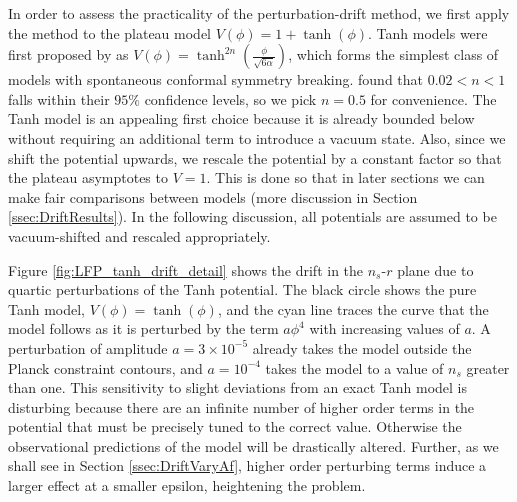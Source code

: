 \documentclass[a4paper,11pt]{article}
\def\nsr{$n_s$-$r$ }
\begin{document}
In order to assess the practicality of the perturbation-drift method, we first apply the method to the plateau model $V(\phi)=1+\tanh(\phi)$. Tanh models were first proposed by \citet{Kallosh+2013} as $V(\phi)=\tanh^{2n}(\tfrac{\phi}{\sqrt{6\alpha}})$, which forms the simplest class of models with spontaneous conformal symmetry breaking. \citet{Planck2015} found that $0.02<n<1$ falls within their $95\%$ confidence levels, so we pick $n=0.5$ for convenience. The Tanh model is an appealing first choice because it is already bounded below without requiring an additional term to introduce a vacuum state. Also, since we shift the potential upwards, we rescale the potential by a constant factor so that the plateau asymptotes to $V=1$. This is done so that in later sections we can make fair comparisons between models (more discussion in Section \ref{ssec:DriftResults}). In the following discussion, all potentials are assumed to be vacuum-shifted and rescaled appropriately.

Figure \ref{fig:LFP_tanh_drift_detail} shows the drift in the \nsr plane due to quartic perturbations of the Tanh potential. The black circle shows the pure Tanh model, $V(\phi)=\tanh(\phi)$, and the cyan line traces the curve that the model follows as it is perturbed by the term $a\phi^4$ with increasing values of $a$. A perturbation of amplitude $a=3\times10^{-5}$ already takes the model outside the Planck constraint contours,  and $a=10^{-4}$ takes the model to a value of $n_s$ greater than one. This sensitivity to slight deviations from an exact Tanh model is disturbing because there are an infinite number of higher order terms in the potential that must be precisely tuned to the correct value. Otherwise the observational predictions of the model will be drastically altered. Further, as we shall see in Section \ref{ssec:DriftVaryAf}, higher order perturbing terms induce a larger effect at a smaller epsilon, heightening the problem.
\end{document}
